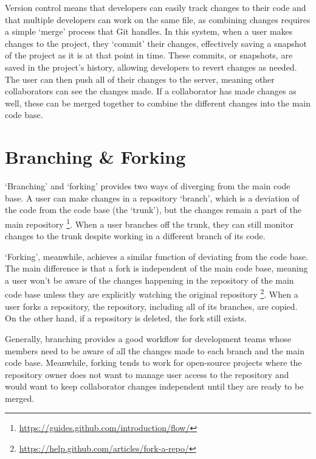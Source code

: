 Version control means that developers can easily track changes to their code and that multiple developers can work on the same file, as combining changes requires a simple `merge' process that Git handles. In this system, when a user makes changes to the project, they `commit' their changes, effectively saving a snapshot of the project as it is at that point in time. These commits, or snapshots, are saved in the project's history, allowing developers to revert changes as needed. The user can then push all of their changes to the server, meaning other collaborators can see the changes made. If a collaborator has made changes as well, these can be merged together to combine the different changes into the main code base.

\section{Branching \& Forking}
`Branching' and `forking' provides two ways of diverging from the main code base. A user can make changes in a repository `branch', which is a deviation of the code from the code base (the `trunk'), but the changes remain a part of the main repository \footnote{\url{https://guides.github.com/introduction/flow/}}. When a user branches off the trunk, they can still monitor changes to the trunk despite working in a different branch of its code.

`Forking', meanwhile, achieves a similar function of deviating from the code base. The main difference is that a fork is independent of the main code base, meaning a user won't be aware of the changes happening in the repository of the main code base unless they are explicitly watching the original repository \footnote{\url{https://help.github.com/articles/fork-a-repo/}}. When a user forks a repository, the repository, including all of its branches, are copied. On the other hand, if a repository is deleted, the fork still exists.

Generally, branching provides a good workflow for development teams whose members need to be aware of all the changes made to each branch and the main code base. Meanwhile, forking tends to work for open-source projects where the repository owner does not want to manage user access to the repository and would want to keep collaborator changes independent until they are ready to be merged.

